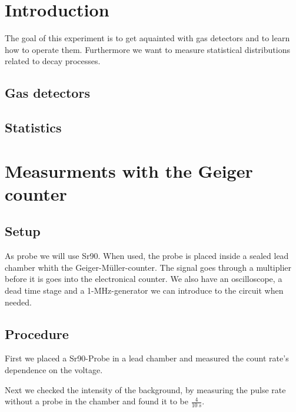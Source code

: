 \tableofcontents
\newpage
\listoffigures

\listoftables

\skippage

\setcounter{page}{1}
\restoregeometry
\thispagestyle{fancy}


\section{Introduction}

The goal of this experiment is to get aquainted with gas detectors and to learn how to operate them. Furthermore we want to measure statistical distributions related to decay processes.

\subsection{Gas detectors}

\subsection{Statistics}

\section{Measurments with the Geiger counter}

\subsection{Setup}

As probe we will use Sr90. When used, the probe is placed inside a sealed lead chamber whith the Geiger-Müller-counter. The signal goes through a multiplier before it is goes into the electronical counter. We also have an oscilloscope, a dead time stage and a 1-MHz-generator we can introduce to the circuit when needed.   

\subsection{Procedure}

First we placed a Sr90-Probe in a lead chamber and measured the count rate's dependence on the voltage.

Next we checked the intensity of the background, by measuring the pulse rate without a probe in the chamber and found it to be $\frac{4}{\SI{10}{s}}$.

